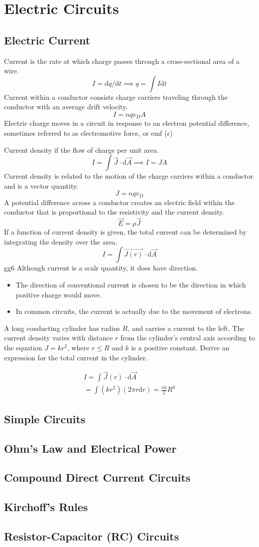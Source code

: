 \documentclass[../em.tex]{subfiles}
\begin{document}
\chapter{Electric Circuits}
\section{Electric Current}
Current is the rate at which charge passes through a cross-sectional area of a wire.
\[I=\mathrm{d}q/\mathrm{d}t \implies q = \int I \mathrm{d}t\]
Current within a conductor consists charge carriers traveling through the conductor with an average drift velocity.
\[I=nqv_D A\]
Electric charge moves in a circuit in response to an electron potential difference, sometimes referred to as electromotive force, or emf ($\epsilon$)

Current density if the flow of charge per unit area.
\[I=\int{\vec{J}\cdot\mathrm{d}\vec{A}} \implies I = JA\]
Current density is related to the motion of the charge carriers within a conductor and is a vector quantity.
\[J=nqv_D\]
A potential difference across a conductor creates an electric field within the conductor that is proportional to the resistivity and the current density.
\[\vec{E}=\rho \vec{J}\]
If a function of current density is given, the total current can be determined by integrating the density over the area.
\[I=\int \vec{J(r)}\cdot\mathrm{d}\vec{A}\]gg6
Although current is a scalr quantity, it does have direction.
\begin{itemize}
    \item The direction of conventional current is chosen to be the direction in which positive charge would move.
    \item In common circuits, the current is actually due to the movement of electrons.
\end{itemize}

\begin{example}
    A long conducting cylinder has radius $R$, and carries a current to the left. The current density varies with distance 
    $r$ from the cylinder's central axis according to the equation $J=kr^2$, where $r\leq R$ and $k$ is a positive constant. Derive an expression
    for the total current in the cylinder.

    \begin{align*}
        I=\int\vec{J}(r)\cdot\mathrm{d}\vec{A} \\
        = \int (kr^2)(2\pi r\mathrm{d}r)
        = \frac{\pi k}{2}R^4
    \end{align*}
\end{example}

\section{Simple Circuits}
\section{Ohm's Law and Electrical Power}
\section{Compound Direct Current Circuits}
\section{Kirchoff's Rules}
\section{Resistor-Capacitor (RC) Circuits}
\end{document}
